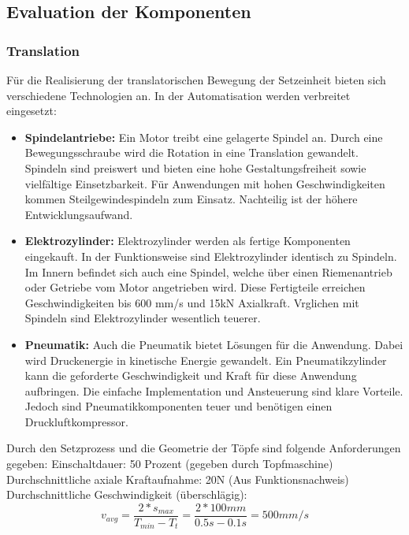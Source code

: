 \subsection{Evaluation der Komponenten}
\label{kap:Evaluation_der_Komponenten}
\subsubsection{Translation}
 	\label{subsec:Translation}

Für die Realisierung der translatorischen Bewegung der Setzeinheit bieten sich verschiedene Technologien an. In der Automatisation werden verbreitet eingesetzt:
	\begin{itemize}
	\item \textbf{Spindelantriebe:}
	Ein Motor treibt eine gelagerte Spindel an. Durch eine Bewegungsschraube wird die Rotation in eine Translation gewandelt. Spindeln sind preiswert und bieten eine hohe Gestaltungsfreiheit sowie vielfältige Einsetzbarkeit. Für Anwendungen mit hohen Geschwindigkeiten kommen Steilgewindespindeln zum Einsatz. Nachteilig ist der höhere Entwicklungsaufwand.
	\item \textbf{Elektrozylinder:}
	Elektrozylinder werden als fertige Komponenten eingekauft. In der Funktionsweise sind Elektrozylinder identisch zu Spindeln. Im Innern befindet sich auch eine Spindel, welche über einen Riemenantrieb oder Getriebe vom Motor angetrieben wird. Diese Fertigteile erreichen Geschwindigkeiten bis 600 mm/s und 15kN Axialkraft. Vrglichen mit Spindeln sind Elektrozylinder wesentlich teuerer.
	\item \textbf{Pneumatik:}
	Auch die Pneumatik bietet Lösungen für die Anwendung. Dabei wird Druckenergie in kinetische Energie gewandelt. Ein Pneumatikzylinder kann die geforderte Geschwindigkeit und Kraft für diese Anwendung aufbringen. Die einfache Implementation und Ansteuerung sind klare Vorteile. Jedoch sind Pneumatikkomponenten teuer und benötigen einen Druckluftkompressor.
	\end{itemize}

Durch den Setzprozess und die Geometrie der Töpfe sind folgende Anforderungen gegeben:
\newline
Einschaltdauer: 50 Prozent (gegeben durch Topfmaschine)
\newline
Durchschnittliche axiale Kraftaufnahme: 20N (Aus Funktionsnachweis)
\newline
Durchschnittliche Geschwindigkeit (überschlägig):
\begin{equation}
v_{avg}=\frac{2*s_{max}}{T_{min}-T_{t}}=\frac{2*100mm}{0.5s-0.1s}=500mm/s
\end{equation}

